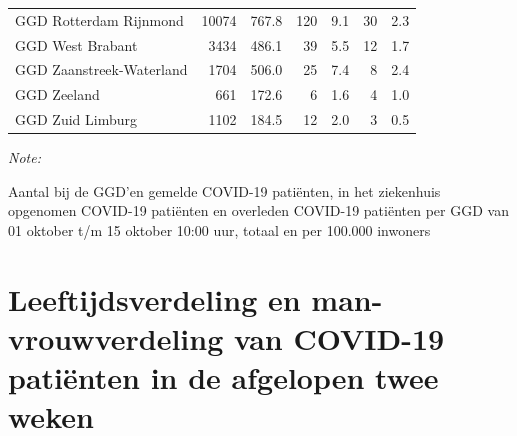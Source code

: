 \documentclass[
  english,
  man,floatsintext]{apa6}
\begin{document}
\begin{table}[H]
\begin{threeparttable}
\begin{tabular}{lrrrrrr}
GGD Rotterdam Rijnmond & 10074 & 767.8 & 120 & 9.1 & 30 & 2.3\\
GGD West Brabant & 3434 & 486.1 & 39 & 5.5 & 12 & 1.7\\
GGD Zaanstreek-Waterland & 1704 & 506.0 & 25 & 7.4 & 8 & 2.4\\
GGD Zeeland & 661 & 172.6 & 6 & 1.6 & 4 & 1.0\\
GGD Zuid Limburg & 1102 & 184.5 & 12 & 2.0 & 3 & 0.5\\
\bottomrule
\end{tabular}
\begin{tablenotes}
\item \textit{Note: } 
\item Aantal bij de GGD’en gemelde COVID-19 patiënten, in het ziekenhuis opgenomen COVID-19 patiënten en overleden COVID-19 patiënten per GGD van 01 oktober t/m 15 oktober 10:00 uur, totaal en per 100.000 inwoners
\end{tablenotes}
\end{threeparttable}
\endgroup{}
\end{table}

\newpage

\hypertarget{leeftijdsverdeling-en-man-vrouwverdeling-van-covid-19-patiuxebnten-in-de-afgelopen-twee-weken}{%
\section{Leeftijdsverdeling en man-vrouwverdeling van COVID-19 patiënten in de afgelopen twee weken}\label{leeftijdsverdeling-en-man-vrouwverdeling-van-covid-19-patiuxebnten-in-de-afgelopen-twee-weken}}
\end{document}

